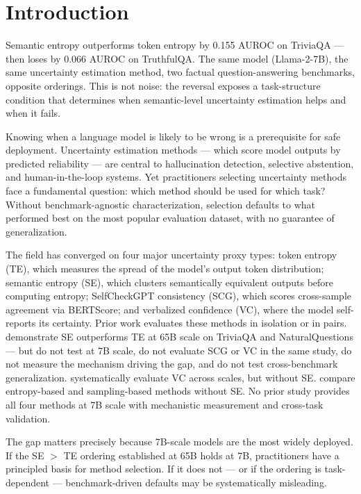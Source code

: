 \section{Introduction}

Semantic entropy outperforms token entropy by 0.155 AUROC on TriviaQA --- then loses by 0.066 AUROC on TruthfulQA.
The same model (Llama-2-7B), the same uncertainty estimation method, two factual question-answering benchmarks, opposite orderings.
This is not noise: the reversal exposes a task-structure condition that determines when semantic-level uncertainty estimation helps and when it fails.

Knowing when a language model is likely to be wrong is a prerequisite for safe deployment.
Uncertainty estimation methods --- which score model outputs by predicted reliability --- are central to hallucination detection, selective abstention, and human-in-the-loop systems.
Yet practitioners selecting uncertainty methods face a fundamental question: which method should be used for which task?
Without benchmark-agnostic characterization, selection defaults to what performed best on the most popular evaluation dataset, with no guarantee of generalization.

The field has converged on four major uncertainty proxy types: token entropy (TE), which measures the spread of the model's output token distribution; semantic entropy (SE), which clusters semantically equivalent outputs before computing entropy; SelfCheckGPT consistency (SCG), which scores cross-sample agreement via BERTScore; and verbalized confidence (VC), where the model self-reports its certainty.
Prior work evaluates these methods in isolation or in pairs.
\citet{Kuhn2023} demonstrate SE outperforms TE at 65B scale on TriviaQA and NaturalQuestions --- but do not test at 7B scale, do not evaluate SCG or VC in the same study, do not measure the mechanism driving the gap, and do not test cross-benchmark generalization.
\citet{Xiong2023} systematically evaluate VC across scales, but without SE.
\citet{Huang2023} compare entropy-based and sampling-based methods without SE.
No prior study provides all four methods at 7B scale with mechanistic measurement and cross-task validation.

The gap matters precisely because 7B-scale models are the most widely deployed.
If the SE $>$ TE ordering established at 65B holds at 7B, practitioners have a principled basis for method selection.
If it does not --- or if the ordering is task-dependent --- benchmark-driven defaults may be systematically misleading.

